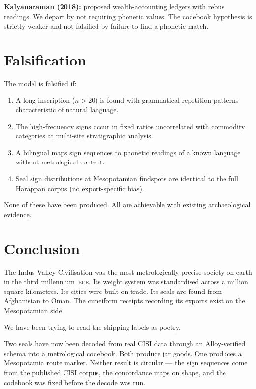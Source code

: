 \textbf{Kalyanaraman (2018):}\smartcite{Kalyanaraman2018}
proposed wealth-accounting ledgers with rebus readings. We depart
by not requiring phonetic values. The codebook hypothesis is
strictly weaker and not falsified by failure to find a phonetic
match.

\section{Falsification}

The model is falsified if:

\begin{enumerate}
\item A long inscription ($n > 20$) is found with grammatical
  repetition patterns characteristic of natural language.
\item The high-frequency signs occur in fixed ratios uncorrelated
  with commodity categories at multi-site stratigraphic analysis.
\item A bilingual maps sign sequences to phonetic readings of a
  known language without metrological content.
\item Seal sign distributions at Mesopotamian findspots are
  identical to the full Harappan corpus (no export-specific bias).
\end{enumerate}

None of these have been produced.
All are achievable with existing archaeological evidence.

\section{Conclusion}

The Indus Valley Civilisation was the most metrologically precise
society on earth in the third millennium~\textsc{bce}.
Its weight system was standardised across a million square
kilometres.
Its cities were built on trade.
Its seals are found from Afghanistan to Oman.
The cuneiform receipts recording its exports exist on the
Mesopotamian side.

We have been trying to read the shipping labels as poetry.

Two seals have now been decoded from real CISI data through an
Alloy-verified schema into a metrological codebook.
Both produce jar goods. One produces a Mesopotamia route marker.
Neither result is circular --- the sign sequences come from the
published CISI corpus, the concordance maps on shape, and the
codebook was fixed before the decode was run.

